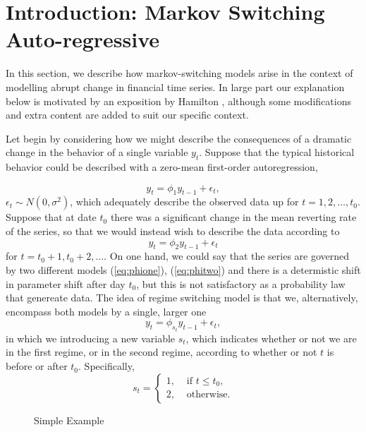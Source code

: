 \documentclass[a4paper]{article}
\author{Chan Pruksapha}
\let\oldref\ref
\renewcommand{\ref}[1]{(\oldref{#1})}
\begin{document}
\section*{Introduction: Markov Switching Auto-regressive}

In this section, we describe how markov-switching models arise in the context of modelling abrupt change in financial time series. In large part our explanation below is motivated by an exposition by Hamilton \cite{ham08}, although some modifications and extra content are added to suit our specific context.

Let begin by considering how we might describe the consequences of a dramatic change in the behavior of a single variable $y_t$. Suppose that the typical historical behavior could be described with a zero-mean first-order autoregression,

\begin{equation}\label{eq:phione}
y_t = \phi_1 y_{t-1} + \epsilon_t,
\end{equation}
$\epsilon_t \sim N(0,\sigma^2)$, which adequately describe the observed data up for $t = 1,2,\dots,t_0$.
Suppose that at date $t_0$ there was a significant change in the mean reverting rate of the series, so that we would instead wish to describe the data according to
\begin{equation}\label{eq:phitwo}
y_t = \phi_2 y_{t-1} + \epsilon_t 
\end{equation}
for $t = t_0+1, t_0+2, \dots$. On one hand, we could say that the series are governed by two different models \ref{eq:phione}, \ref{eq:phitwo} and there is a determistic shift in parameter shift after day $t_0$, but this is not satisfactory as a probability law that genereate data. The idea of regime switching model is that we, alternatively, encompass both models by a single, larger one
\begin{equation}
y_t = \phi_{s_t} y_{t-1} + \epsilon_t,
\end{equation}
in which we introducing a new variable $s_t$, which indicates whether or not we are in the first regime, or in the second regime, according to whether or not $t$ is before or after $t_0$. Specifically,
\begin{equation*}
s_t = 
\begin{cases}
1, & \text{ if } t\leq t_0,\\
2, & \text{ otherwise.}
\end{cases}
\end{equation*}


\begin{figure}[!h]
\centering

\caption{Simple Example}
\end{figure}
\end{document}
